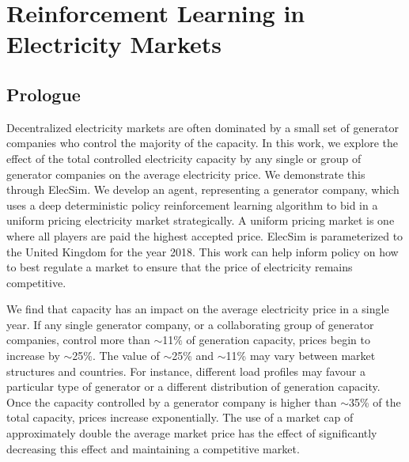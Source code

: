 \chapter{Reinforcement Learning in Electricity Markets}
\label{chapter:reinforcement}
\ifpdf
    \graphicspath{{Chapter3/Figs/Raster/}{Chapter3/Figs/PDF/}{Chapter3/Figs/}}
\else
    \graphicspath{{Chapter3/Figs/Vector/}{Chapter3/Figs/}}
\fi


\section*{Prologue}


Decentralized electricity markets are often dominated by a small set of generator companies who control the majority of the capacity. In this work, we explore the effect of the total controlled electricity capacity by any single or group of generator companies on the average electricity price. We demonstrate this through ElecSim. We develop an agent, representing a generator company, which uses a deep deterministic policy reinforcement learning algorithm to bid in a uniform pricing electricity market strategically. A uniform pricing market is one where all players are paid the highest accepted price. ElecSim is parameterized to the United Kingdom for the year 2018. This work can help inform policy on how to best regulate a market to ensure that the price of electricity remains competitive.

We find that capacity has an impact on the average electricity price in a single year. If any single generator company, or a collaborating group of generator companies, control more than ${\sim}$11$\%$ of generation capacity, prices begin to increase by ${\sim}$25$\%$. The value of ${\sim}$25\% and ${\sim}$11\% may vary between market structures and countries. For instance, different load profiles may favour a particular type of generator or a different distribution of generation capacity. Once the capacity controlled by a generator company is higher than ${\sim}$35\% of the total capacity, prices increase exponentially. The use of a market cap of approximately double the average market price has the effect of significantly decreasing this effect and maintaining a competitive market.

